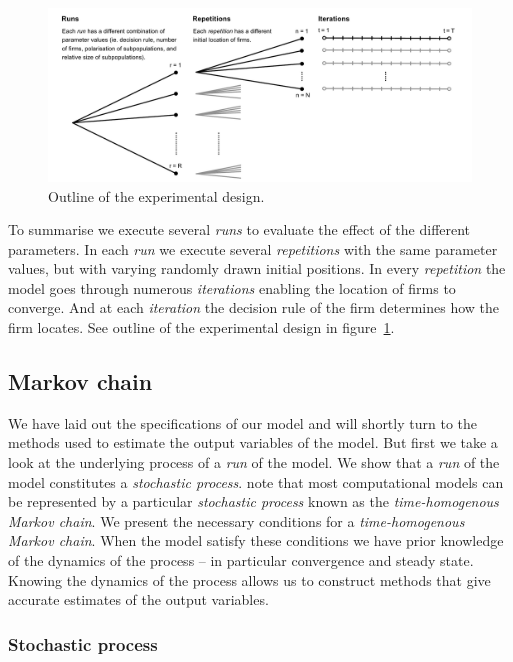 \documentclass[preprint, 12pt]{elsarticle}
\begin{document}
\begin{figure}[ht!]
	\centering
	\includegraphics[width=\textwidth, trim={10mm 0 10mm 0}]{Graphics/ExperimentalDesign.pdf}
	\caption{Outline of the experimental design.}
	\label{fig:experimental}
\end{figure}

To summarise we execute several \emph{runs} to evaluate the effect of the different parameters. In each \emph{run} we execute several \emph{repetitions} with the same parameter values, but with varying randomly drawn initial positions. In every \emph{repetition} the model goes through numerous \emph{iterations} enabling the location of firms to converge. And at each \emph{iteration} the decision rule of the firm determines how the firm locates. See outline of the experimental design in figure~\ref{fig:experimental}.

\subsection{Markov chain}

We have laid out the specifications of our model and will shortly turn to the methods used to estimate the output variables of the model. But first we take a look at the underlying process of a \emph{run} of the model. We show that a \emph{run} of the model constitutes a \emph{stochastic process}. \citet{Laver_Sergenti_2011} note that most computational models can be represented by a particular \emph{stochastic process} known as the \emph{time-homogenous Markov chain}. We present the necessary conditions for a \emph{time-homogenous Markov chain}. When the model satisfy these conditions we have prior knowledge of the dynamics of the process -- in particular convergence and steady state. Knowing the dynamics of the process allows us to construct methods that give accurate estimates of the output variables.

\subsubsection{Stochastic process}
\end{document}

